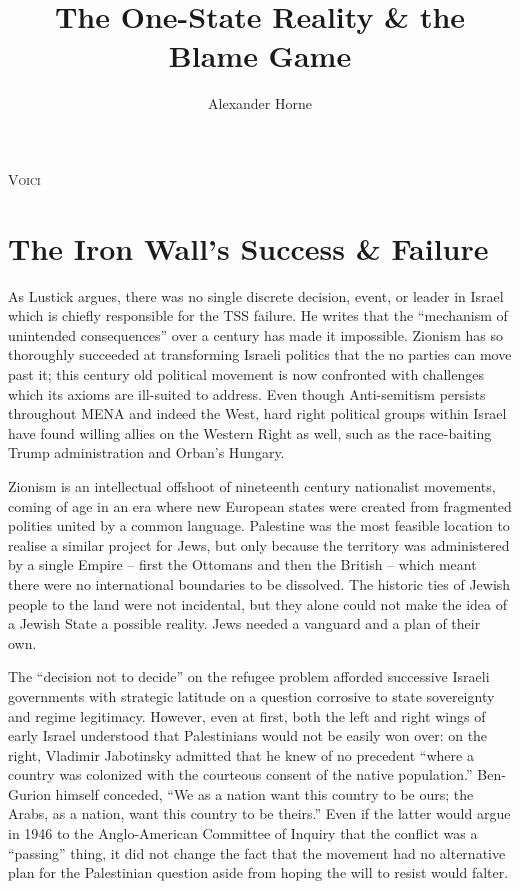 \documentclass[letterpaper,12pt,twoside]{article} %
\title{\Huge The One-State Reality \& the Blame Game}
\author{\large Alexander Horne}
\date{} %
\begin{document}
\maketitle

\begin{adjustwidth}{1in}{1in}
    \lipsum[2]
\end{adjustwidth}

\begin{multicols}{2}

\lettrine[lraise=0.1, nindent=0em, slope=-.5em]{V}{oici} 

\section{The Iron Wall's Success \& Failure}

As Lustick argues, there was no single discrete decision, event, or leader in Israel which is chiefly responsible for the TSS failure. He writes that the ``mechanism of unintended consequences'' over a century has made it impossible.\autocite{lustick2019paradigm} Zionism has so thoroughly succeeded at transforming Israeli politics that the no parties can move past it; this century old political movement is now confronted with challenges which its axioms are ill-suited to address. Even though Anti-semitism persists throughout MENA and indeed the West, hard right political groups within Israel have found willing allies on the Western Right as well, such as the race-baiting Trump administration and Orban's Hungary. 

Zionism is an intellectual offshoot of nineteenth century nationalist movements, coming of age in an era where new European states were created from fragmented polities united by a common language. Palestine was the most feasible location to realise a similar project for Jews, but only because the territory was administered by a single Empire -- first the Ottomans and then the British -- which meant there were no international boundaries to be dissolved. The historic ties of Jewish people to the land were not incidental, but they alone could not make the idea of a Jewish State a possible reality. Jews needed a vanguard and a plan of their own.

The ``decision not to decide'' on the refugee problem afforded successive Israeli governments with strategic latitude on a question corrosive to state sovereignty and regime legitimacy. However, even at first, both the left and right wings of early Israel understood that Palestinians would not be easily won over: on the right, Vladimir Jabotinsky admitted that he knew of no precedent ``where a country was colonized with the courteous consent of the native population.''\autocite[113]{caplan1978question} Ben-Gurion himself conceded, ``We as a nation want this country to be ours; the Arabs, as a nation, want this country to be theirs.''\autocite[80]{smith1988palestine} Even if the latter would argue in 1946 to the Anglo-American Committee of Inquiry that the conflict was a ``passing'' thing, it did not change the fact that the movement had no alternative plan for the Palestinian question aside from hoping the will to resist would falter. 


\end{multicols}
\end{document}
